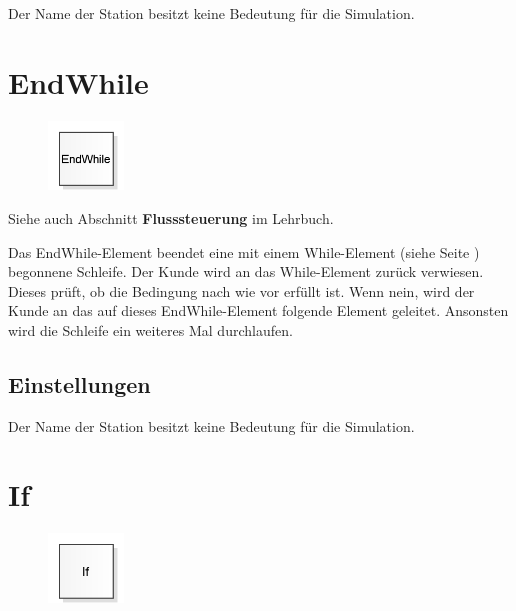 Der Name der Station besitzt keine Bedeutung für die Simulation.


\section{EndWhile}
\label{ref:ModelElementLogicEndWhile}

\begin{figure}
\vspace{-22pt}
\includegraphics[width=2cm]{imageModelElementLogicEndWhile.png}
\vspace{-22pt}
\end{figure}

Siehe auch Abschnitt \textbf{Flusssteuerung} im Lehrbuch.

Das EndWhile-Element beendet eine mit einem
While-Element (siehe Seite \pageref{ref:ModelElementLogicWhile}) begonnene
Schleife. Der Kunde wird an das While-Element zurück verwiesen.
Dieses prüft, ob die Bedingung nach wie vor erfüllt ist.
Wenn nein, wird der Kunde an das auf dieses EndWhile-Element
folgende Element geleitet. Ansonsten wird die Schleife ein
weiteres Mal durchlaufen.

\subsection*{Einstellungen}

Der Name der Station besitzt keine Bedeutung für die Simulation.


\section{If}
\label{ref:ModelElementLogicIf}

\begin{figure}
\vspace{-22pt}
\includegraphics[width=2cm]{imageModelElementLogicIf.png}
\vspace{-22pt}
\end{figure}

